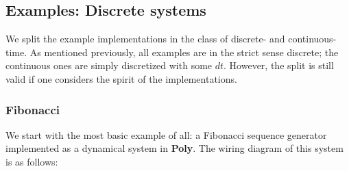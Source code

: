 \subsection{Examples: Discrete systems}

We split the example implementations in the class of discrete- and continuous-time. As mentioned previously, all examples are in the strict sense discrete; the continuous ones are simply discretized with some $dt$. However, the split is still valid if one considers the spirit of the implementations.

\subsubsection{Fibonacci}
We start with the most basic example of all: a Fibonacci sequence generator implemented as a dynamical system in \textbf{Poly}. The wiring diagram of this system is as follows:

